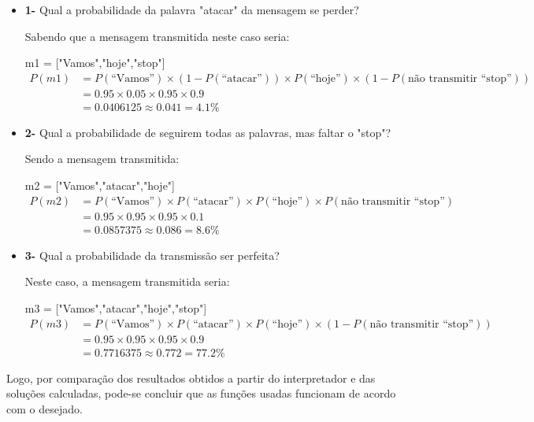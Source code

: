 \documentclass[11pt, a4paper, fleqn]{article}
\begin{document}
\begin{itemize}
     \item \textbf{1-} Qual a probabilidade da palavra "atacar" da mensagem se perder? 

     Sabendo que a mensagem transmitida neste caso seria:

     m1 = ["Vamos","hoje","stop"]
     \begin{align*}
     P(m1) &= P(\text{``Vamos''}) 
          \times (1 - P(\text{``atacar''})) 
          \times P(\text{``hoje''}) 
          \times (1 - P(\text{não transmitir ``stop''})) \\
          &= 0.95 \times 0.05 \times 0.95 \times 0.9 \\
          &= 0.0406125 \approx 0.041 = 4.1\%
     \end{align*}


     \item \textbf{2-} Qual a probabilidade de seguirem todas as palavras, mas faltar o "stop"?

     Sendo a mensagem transmitida: 

     m2 = ["Vamos","atacar","hoje"]
     \begin{align*}
     P(m2) &= P(\text{``Vamos''}) 
          \times P(\text{``atacar''}) 
          \times P(\text{``hoje''}) 
          \times P(\text{não transmitir ``stop''}) \\
          &= 0.95 \times 0.95 \times 0.95 \times 0.1 \\
          &= 0.0857375 \approx 0.086 = 8.6\%
     \end{align*}


     \item \textbf{3-} Qual a probabilidade da transmissão ser perfeita?

     Neste caso, a mensagem transmitida seria:

     m3 = ["Vamos","atacar","hoje","stop"]
     \begin{align*}
     P(m3) &= P(\text{``Vamos''}) 
          \times P(\text{``atacar''}) 
          \times P(\text{``hoje''}) 
          \times (1 - P(\text{não transmitir ``stop''})) \\
          &= 0.95 \times 0.95 \times 0.95 \times 0.9 \\
          &= 0.7716375 \approx 0.772 = 77.2\%
     \end{align*}
\end{itemize}

Logo, por comparação dos resultados obtidos a partir do interpretador e das soluções calculadas, pode-se concluir que as funções usadas funcionam de acordo com o desejado.



\printindex





\end{document}
